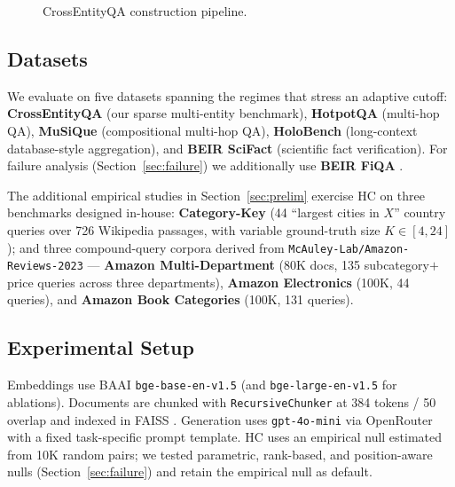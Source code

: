 \documentclass[letterpaper]{article}
\begin{document}
\begin{figure}[t]
\centering
\caption{CrossEntityQA construction pipeline.}
\label{fig:ceqa}
\end{figure}

\subsection{Datasets}
We evaluate on five datasets spanning the regimes that stress an
adaptive cutoff: \textbf{CrossEntityQA} (our sparse multi-entity
benchmark), \textbf{HotpotQA} \cite{yang2018hotpotqa} (multi-hop QA),
\textbf{MuSiQue} \cite{trivedi2022musique} (compositional multi-hop
QA), \textbf{HoloBench} \cite{maekawa2024holobench} (long-context
database-style aggregation), and \textbf{BEIR SciFact}
\cite{thakur2021beir,wadden2020scifact} (scientific fact
verification). For failure analysis (Section~\ref{sec:failure}) we
additionally use \textbf{BEIR FiQA} \cite{thakur2021beir}.

The additional empirical studies in Section~\ref{sec:prelim}
exercise HC on three benchmarks designed in-house:
\textbf{Category-Key} (44 ``largest cities in $X$'' country queries
over 726 Wikipedia passages, with variable ground-truth size
$K \in [4,24]$); and three compound-query corpora derived from
\texttt{McAuley-Lab/Amazon-Reviews-2023} --- \textbf{Amazon
Multi-Department} (80K docs, 135 subcategory$+$price queries across
three departments), \textbf{Amazon Electronics} (100K, 44 queries),
and \textbf{Amazon Book Categories} (100K, 131 queries).

\subsection{Experimental Setup}
Embeddings use BAAI \texttt{bge-base-en-v1.5}
\cite{bgeembeddings2023} (and \texttt{bge-large-en-v1.5} for
ablations). Documents are chunked with \texttt{RecursiveChunker} at
384 tokens / 50 overlap and indexed in FAISS \cite{johnson2019faiss}.
Generation uses \texttt{gpt-4o-mini} via OpenRouter with a fixed
task-specific prompt template. HC uses an empirical null estimated
from 10K random pairs; we tested parametric, rank-based, and
position-aware nulls (Section~\ref{sec:failure}) and retain the
empirical null as default.
\end{document}

